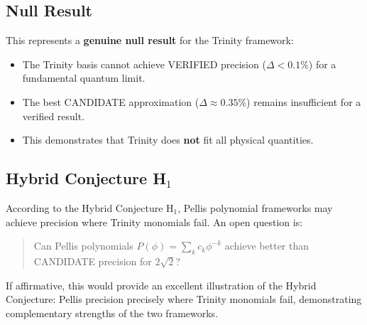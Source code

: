 \subsection{Null Result}

This represents a \textbf{genuine null result} for the Trinity framework:
\begin{itemize}
\item The Trinity basis cannot achieve VERIFIED precision ($\Delta < 0.1\%$) for
      a fundamental quantum limit.
\item The best CANDIDATE approximation ($\Delta \approx 0.35\%$) remains
      insufficient for a verified result.
\item This demonstrates that Trinity does \textbf{not} fit all physical quantities.
\end{itemize}

\subsection{Hybrid Conjecture H$_1$}

According to the Hybrid Conjecture H$_1$, Pellis polynomial frameworks
may achieve precision where Trinity monomials fail. An open question is:
\begin{quote}
Can Pellis polynomials $P(\phi) = \sum_k c_k \phi^{-k}$ achieve
better than CANDIDATE precision for $2\sqrt{2}$?
\end{quote}

If affirmative, this would provide an excellent illustration of the Hybrid
Conjecture: Pellis precision precisely where Trinity monomials fail,
demonstrating complementary strengths of the two frameworks.
